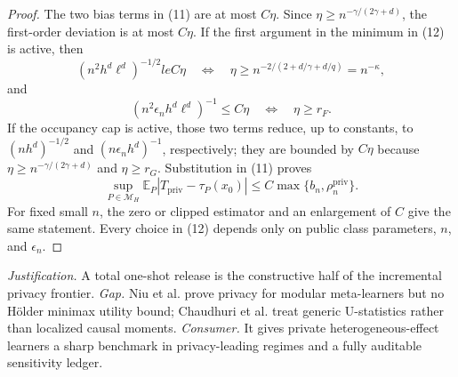 \documentclass{article}
\begin{document}
\begin{proof}
The two bias terms in (11) are at most \(C\eta\).  Since \(\eta\ge n^{-\gamma/(2\gamma+d)}\), the first-order deviation is at most \(C\eta\).  If the first argument in the minimum in (12) is active, then
\[
 (n^2h^d\ell^d)^{-1/2}le C\eta
 \quad\Longleftrightarrow\quad
 \eta\ge n^{-2/(2+d/\gamma+d/q)}=n^{-\kappa},
\]
and
\[
 (n^2\epsilon_nh^d\ell^d)^{-1}\le C\eta
 \quad\Longleftrightarrow\quad \eta\ge r_F.
\]
If the occupancy cap is active, those two terms reduce, up to constants, to \((nh^d)^{-1/2}\) and \((n\epsilon_nh^d)^{-1}\), respectively; they are bounded by \(C\eta\) because \(\eta\ge n^{-\gamma/(2\gamma+d)}\) and \(\eta\ge r_G\).  Substitution in (11) proves
\[
 \sup_{P\in\mathcal M_H}\mathbb E_P|T_{\mathrm{priv}}-\tau_P(x_0)|
 \le C\max\{b_n,\rho_n^{\mathrm{priv}}\}.
\]
For fixed small \(n\), the zero or clipped estimator and an enlargement of \(C\) give the same statement.  Every choice in (12) depends only on public class parameters, \(n\), and \(\epsilon_n\).
\end{proof}
\par\smallskip\noindent \textit{Justification.} A total one-shot release is the constructive half of the incremental privacy frontier. \textit{Gap.} Niu et al. prove privacy for modular meta-learners but no Hölder minimax utility bound; Chaudhuri et al. treat generic U-statistics rather than localized causal moments. \textit{Consumer.} It gives private heterogeneous-effect learners a sharp benchmark in privacy-leading regimes and a fully auditable sensitivity ledger.
\end{document}
